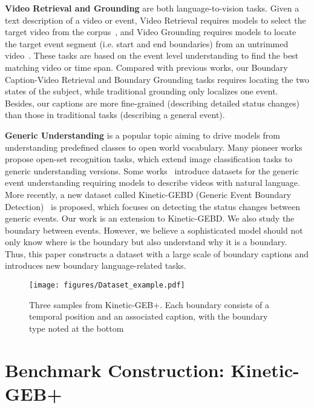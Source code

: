 \documentclass[runningheads]{llncs}
\begin{document}
\textbf{Video Retrieval and Grounding} are both language-to-vision tasks. Given a text description of a video or event, Video Retrieval requires models to select the target video from the corpus~\cite{bain2021frozen,cheng2021improving,portillo2021straightforward}, and Video Grounding requires models to locate the target event segment (i.e. start and end boundaries) from an untrimmed video~\cite{cao2021pursuit,ge2019mac,mun2020local,yuan2019find,zeng2020dense}. 
These tasks are based on the event level understanding to find the best matching video or time span.
Compared with previous works, our Boundary Caption-Video Retrieval and Boundary Grounding tasks requires locating the two states of the subject, while traditional grounding only localizes one event. Besides, our captions are more fine-grained (describing detailed status changes) than those in traditional tasks (describing a general event).





\textbf{Generic Understanding} is a popular topic aiming to drive models from understanding predefined classes to open world vocabulary. 
Many pioneer works~\cite{bendale2015towards} propose open-set recognition tasks, which extend image classification tasks to generic understanding versions.
Some works~\cite{krishna2017dense,zhou2018towards} introduce datasets for the generic event understanding requiring models to describe videos with natural language. 
More recently, a new dataset called Kinetic-GEBD (Generic Event Boundary Detection)~\cite{shou2021generic} is proposed, which focuses on detecting the status changes between generic events. 
Our work is an extension to Kinetic-GEBD. 
We also study the boundary between events. 
However, we believe a sophisticated model should not only know where is the boundary but also understand why it is a boundary. 
Thus, this paper constructs a dataset with a large scale of boundary captions and introduces new boundary language-related tasks. 
 \begin{figure}[t]
\centering
\texttt{[image: figures/Dataset\_example.pdf]}
\setlength{\abovecaptionskip}{0.5cm}
\caption{Three samples from Kinetic-GEB+. Each boundary consists of a temporal position and an associated caption, with the boundary type noted at the bottom}
\label{fig:example}
\end{figure}

\section{Benchmark Construction: Kinetic-GEB+}
\end{document}
